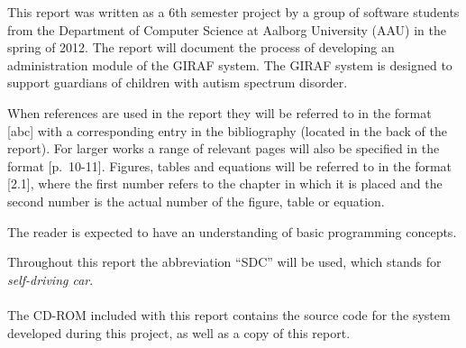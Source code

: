 This report was written as a 6th semester project by a group of software students from the Department of Computer Science at Aalborg University (AAU) in the spring of 2012. The report will document the process of developing an administration module of the GIRAF system. The GIRAF system is designed to support guardians of children with autism spectrum disorder.

When references are used in the report they will be referred to in the format [abc] with a corresponding entry in the bibliography (located in the back of the report). For larger works a range of relevant pages will also be specified in the format [p.~10-11]. Figures, tables and equations will be referred to in the format [2.1], where the first number refers to the chapter in which it is placed and the second number is the actual number of the figure, table or equation.

The reader is expected to have an understanding of basic programming concepts.

Throughout this report the abbreviation ``SDC'' will be used, which stands for \emph{self-driving car}.
\\ \\
The CD-ROM included with this report contains the source code for the system developed during this project, as well as a copy of this report.